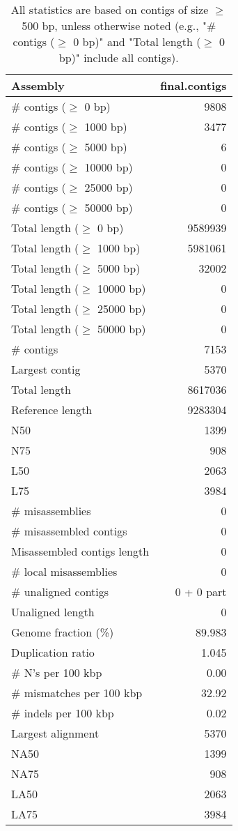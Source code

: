 \documentclass[12pt,a4paper]{article}
\begin{document}
\begin{table}[ht]
\begin{center}
\caption{All statistics are based on contigs of size $\geq$ 500 bp, unless otherwise noted (e.g., "\# contigs ($\geq$ 0 bp)" and "Total length ($\geq$ 0 bp)" include all contigs).}
\begin{tabular}{|l*{1}{|r}|}
\hline
Assembly & final.contigs \\ \hline
\# contigs ($\geq$ 0 bp) & 9808 \\ \hline
\# contigs ($\geq$ 1000 bp) & 3477 \\ \hline
\# contigs ($\geq$ 5000 bp) & 6 \\ \hline
\# contigs ($\geq$ 10000 bp) & 0 \\ \hline
\# contigs ($\geq$ 25000 bp) & 0 \\ \hline
\# contigs ($\geq$ 50000 bp) & 0 \\ \hline
Total length ($\geq$ 0 bp) & 9589939 \\ \hline
Total length ($\geq$ 1000 bp) & 5981061 \\ \hline
Total length ($\geq$ 5000 bp) & 32002 \\ \hline
Total length ($\geq$ 10000 bp) & 0 \\ \hline
Total length ($\geq$ 25000 bp) & 0 \\ \hline
Total length ($\geq$ 50000 bp) & 0 \\ \hline
\# contigs & 7153 \\ \hline
Largest contig & 5370 \\ \hline
Total length & 8617036 \\ \hline
Reference length & 9283304 \\ \hline
N50 & 1399 \\ \hline
N75 & 908 \\ \hline
L50 & 2063 \\ \hline
L75 & 3984 \\ \hline
\# misassemblies & 0 \\ \hline
\# misassembled contigs & 0 \\ \hline
Misassembled contigs length & 0 \\ \hline
\# local misassemblies & 0 \\ \hline
\# unaligned contigs & 0 + 0 part \\ \hline
Unaligned length & 0 \\ \hline
Genome fraction (\%) & 89.983 \\ \hline
Duplication ratio & 1.045 \\ \hline
\# N's per 100 kbp & 0.00 \\ \hline
\# mismatches per 100 kbp & 32.92 \\ \hline
\# indels per 100 kbp & 0.02 \\ \hline
Largest alignment & 5370 \\ \hline
NA50 & 1399 \\ \hline
NA75 & 908 \\ \hline
LA50 & 2063 \\ \hline
LA75 & 3984 \\ \hline
\end{tabular}
\end{center}
\end{table}
\end{document}

